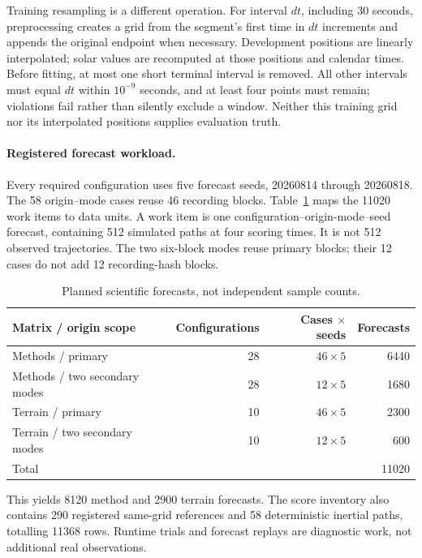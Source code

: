 \documentclass[11pt]{article}
\begin{document}
Training resampling is a different operation. For interval \(dt\), including
30 seconds, preprocessing creates a grid from the segment's first time in
\(dt\) increments and appends the original endpoint when necessary.
Development positions are linearly interpolated; solar values are recomputed
at those positions and calendar times. Before fitting, at most one short
terminal interval is removed. All other intervals must equal \(dt\) within
\(10^{-9}\) seconds, and at least four points must remain; violations fail
rather than silently exclude a window. Neither this training grid nor its
interpolated positions supplies evaluation truth.

\paragraph{Registered forecast workload.}\label{sec:forecast-inventory}
Every required configuration uses five forecast seeds, 20260814 through
20260818. The 58 origin--mode cases reuse 46 recording blocks.
Table~\ref{tab:forecast-counts} maps the 11020 work items to data units.
A work item is one configuration--origin-mode--seed forecast, containing
512 simulated paths at four scoring times. It is not 512 observed
trajectories. The two six-block modes reuse primary blocks; their 12 cases
do not add 12 recording-hash blocks.

\begin{table}[htbp]
\centering\small
\caption{Planned scientific forecasts, not independent sample counts.}
\label{tab:forecast-counts}
\begin{tabular}{@{}lrrr@{}}
\toprule
Matrix / origin scope & Configurations & Cases $\times$ seeds & Forecasts\\
\midrule
Methods / primary & 28 & $46\times5$ & 6440\\
Methods / two secondary modes & 28 & $12\times5$ & 1680\\
Terrain / primary & 10 & $46\times5$ & 2300\\
Terrain / two secondary modes & 10 & $12\times5$ & 600\\
\midrule
Total & & & 11020\\
\bottomrule
\end{tabular}
\end{table}

This yields 8120 method and 2900 terrain forecasts. The score inventory also
contains 290 registered same-grid references and 58 deterministic inertial
paths, totalling 11368 rows. Runtime trials and forecast replays are diagnostic
work, not additional real observations.
\end{document}
